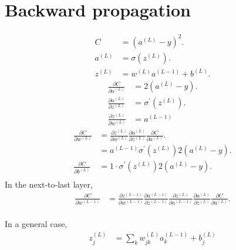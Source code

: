 \section{Backward propagation}
\begin{align}
C &= (a^{(L)} - y)^2. \\
a^{(L)} &= \sigma(z^{(L)}). \\
z^{(L)} &= w^{(L)} a^{(L - 1)} + b^{(L)}.
\end{align}
\begin{align}
\frac{\partial C}{\partial a^{(L)}} &= 2(a^{(L)} - y). \\
\frac{\partial a^{(L)}}{\partial z^{(L)}} &= \sigma^{\prime} (z^{(L)}). \\
\frac{\partial z^{(L)}}{\partial w^{(L)}} &= a^{(L-1)}
\end{align}
\begin{align}
\frac{\partial C}{\partial w^{(L)}} &= 
\frac{\partial z^{(L)}}{\partial w^{(L)}} 
\frac{\partial a^{(L)}}{\partial z^{(L)}}
\frac{\partial C}{\partial a^{(L)}}. \\
&= a^{(L-1)} \sigma^{\prime} (z^{(L)}) 2(a^{(L)} - y). \\
\frac{\partial C}{\partial b^{(L)}} &= 1 \cdot \sigma^{\prime} (z^{(L)}) 2(a^{(L)} - y). \\
\end{align}
In the next-to-last layer,
\begin{align}
\frac{\partial C}{\partial w^{(L-1)}} &= 
\frac{\partial z^{(L-1)}}{\partial w^{(L-1)}}
\frac{\partial a^{(L-1)}}{\partial z^{(L-1)}}
\frac{\partial z^{(L)}}{\partial a^{(L-1)}} 
\frac{\partial a^{(L)}}{\partial z^{(L)}}
\frac{\partial C}{\partial a^{(L)}}. \\
\end{align}

In a general case,
\begin{align}
z_j^{(L)} &= \sum_k w_{jk}^{(L)} a_k^{(L-1)} + b_j^{(L)}
\end{align}

